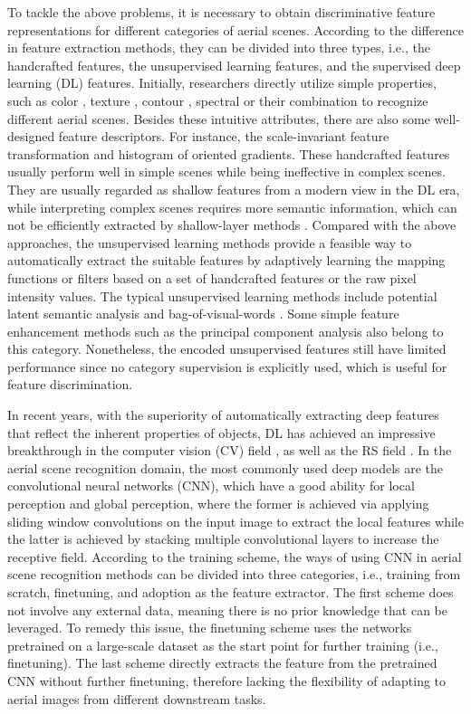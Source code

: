 \documentclass[10pt, journal,twoside]{IEEEtran}
\begin{document}
To tackle the above problems, it is necessary to obtain discriminative feature representations for different categories of aerial scenes. According to the difference in feature extraction methods, they can be divided into three types, i.e., the handcrafted features, the unsupervised learning features, and the supervised deep learning (DL) features. Initially, researchers directly utilize simple properties, such as  color \cite{asr_color}, texture \cite{asr_texture}, contour \cite{asr_shape}, spectral or their combination \cite{asr_spectral_comb1} to recognize different aerial scenes. Besides these intuitive attributes, there are also some well-designed feature descriptors. For instance, the scale-invariant feature transformation and histogram of oriented gradients. These handcrafted features usually perform well in simple scenes while being ineffective in complex scenes. They are usually regarded as shallow features from a modern view in the DL era, while interpreting complex scenes requires more semantic information, which can not be efficiently extracted by shallow-layer methods \cite{representlearning}. Compared with the above approaches, the unsupervised learning methods provide a feasible way to automatically extract the suitable features by adaptively learning the mapping functions or filters based on a set of handcrafted features or the raw pixel intensity values. The typical unsupervised learning methods include potential latent semantic analysis \cite{plsa} and bag-of-visual-words \cite{bovw}. Some simple feature enhancement methods such as the principal component analysis also belong to this category. Nonetheless, the encoded unsupervised features still have limited performance since no category supervision is explicitly used, which is useful for feature discrimination.

In recent years, with the superiority of automatically extracting deep features that reflect the inherent properties of objects, DL has achieved an impressive breakthrough in the computer vision (CV) field \cite{vgg,resnet,swint,xu2021vitae,upernet,zj_segmentation2,zj_segmentation3}, as well as the RS field \cite{assmn,zj_segmentation1,fullycontnet}. In the aerial scene recognition domain, the most commonly used deep models are the convolutional neural networks (CNN), which have a good ability for local perception and global perception, where the former is achieved via applying sliding window convolutions on the input image to extract the local features while the latter is achieved by stacking multiple convolutional layers to increase the receptive field. According to the training scheme, the ways of using CNN in aerial scene recognition methods can be divided into three categories, i.e., training from scratch, finetuning, and adoption as the feature extractor. The first scheme does not involve any external data, meaning there is no prior knowledge that can be leveraged. To remedy this issue, the finetuning scheme uses the networks pretrained on a large-scale dataset as the start point for further training (i.e., finetuning). The last scheme directly extracts the feature from the pretrained CNN without further finetuning, therefore lacking the flexibility of adapting to aerial images from different downstream tasks.
\end{document}
